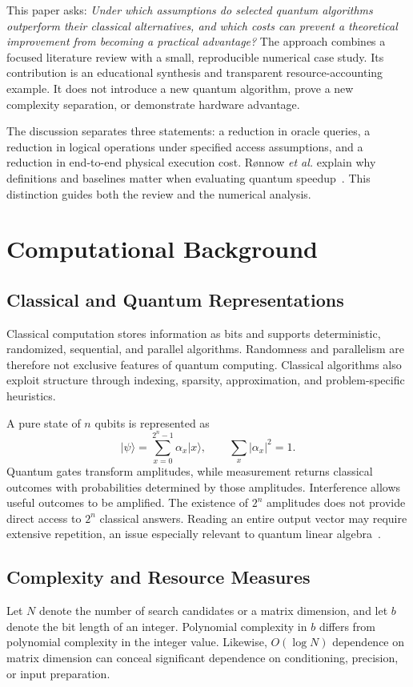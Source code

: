 \documentclass[conference]{IEEEtran}
\newcommand{\ket}[1]{\lvert #1\rangle}
\begin{document}
This paper asks: \emph{Under which assumptions do selected quantum algorithms outperform their classical alternatives, and which costs can prevent a theoretical improvement from becoming a practical advantage?} The approach combines a focused literature review with a small, reproducible numerical case study. Its contribution is an educational synthesis and transparent resource-accounting example. It does not introduce a new quantum algorithm, prove a new complexity separation, or demonstrate hardware advantage.

The discussion separates three statements: a reduction in oracle queries, a reduction in logical operations under specified access assumptions, and a reduction in end-to-end physical execution cost. R\o nnow \emph{et al.} explain why definitions and baselines matter when evaluating quantum speedup~\cite{ronnow}. This distinction guides both the review and the numerical analysis.

\section{Computational Background}
\subsection{Classical and Quantum Representations}
Classical computation stores information as bits and supports deterministic, randomized, sequential, and parallel algorithms. Randomness and parallelism are therefore not exclusive features of quantum computing. Classical algorithms also exploit structure through indexing, sparsity, approximation, and problem-specific heuristics.

A pure state of $n$ qubits is represented as
\begin{equation}
\ket{\psi}=\sum_{x=0}^{2^n-1}\alpha_x\ket{x},\qquad
\sum_x |\alpha_x|^2=1.
\end{equation}
Quantum gates transform amplitudes, while measurement returns classical outcomes with probabilities determined by those amplitudes. Interference allows useful outcomes to be amplified. The existence of $2^n$ amplitudes does not provide direct access to $2^n$ classical answers. Reading an entire output vector may require extensive repetition, an issue especially relevant to quantum linear algebra~\cite{hhl,aaronson}.

\subsection{Complexity and Resource Measures}
Let $N$ denote the number of search candidates or a matrix dimension, and let $b$ denote the bit length of an integer. Polynomial complexity in $b$ differs from polynomial complexity in the integer value. Likewise, $O(\log N)$ dependence on matrix dimension can conceal significant dependence on conditioning, precision, or input preparation.
\end{document}
